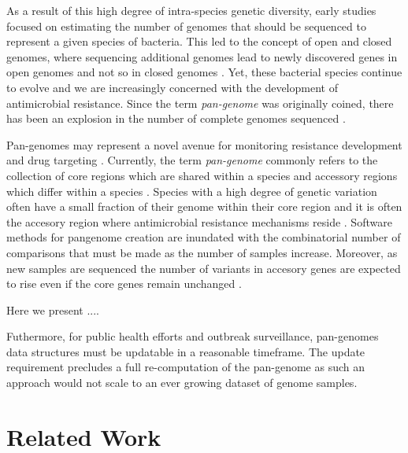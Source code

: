 \documentclass{article}
\begin{document}
As a result of this high degree of intra-species genetic diversity, early studies \cite{tettelin2005genome, tettelin2008comparative} focused on estimating the number of genomes that should be sequenced to represent a given species of bacteria.
This led to the concept of open and closed genomes, where sequencing additional genomes lead to newly discovered genes in open genomes and not so in closed genomes \cite{tettelin2008comparative}.
Yet, these bacterial species continue to evolve and we are increasingly concerned with the development of antimicrobial resistance.
Since the term \textit{pan-genome} was originally coined, there has been an explosion in the number of complete genomes sequenced \cite{vernikos2015ten}.


Pan-genomes may represent a novel avenue for monitoring resistance development \cite{tettelin2005genome} and drug targeting \cite{muzzi2007pan}.
Currently, the term \textit{pan-genome} commonly refers to the collection of core regions which are shared within a species and accessory regions which differ within a species \cite{tettelin2005genome, vernikos2015ten}.
Species with a high degree of genetic variation often have a small fraction of their genome within their core region \cite{rouli2015bacterial} and it is often the accesory region where antimicrobial resistance mechanisms reside \cite{muzzi2007pan}.
Software methods for pangenome creation are inundated with the combinatorial number of comparisons that must be made as the number of samples increase.
Moreover, as new samples are sequenced the number of variants in accesory genes are expected to rise even if the core genes remain unchanged \cite{medini2005microbial}.

Here we present ....


Futhermore, for public health efforts and outbreak surveillance, pan-genomes data structures must be updatable in a reasonable timeframe.
The update requirement precludes a full re-computation of the pan-genome as such an approach would not scale to an ever growing dataset of genome samples.

\enlargethispage{-65.1pt}

\section{Related Work}
\end{document}
